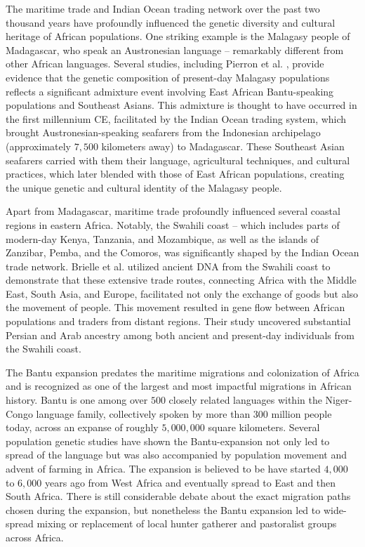The maritime trade and Indian Ocean trading network over the past two thousand years have profoundly influenced the genetic diversity and cultural heritage of African populations. One striking example is the Malagasy people of Madagascar, who speak an Austronesian language -- remarkably different from other African languages. Several studies, including Pierron et al. \cite{pierron2014genome, pierron2017genomic}, provide evidence that the genetic composition of present-day Malagasy populations reflects a significant admixture event involving East African Bantu-speaking populations and Southeast Asians. This admixture is thought to have occurred in the first millennium CE, facilitated by the Indian Ocean trading system, which brought Austronesian-speaking seafarers from the Indonesian archipelago (approximately $7{,}500$ kilometers away) to Madagascar. These Southeast Asian seafarers carried with them their language, agricultural techniques, and cultural practices, which later blended with those of East African populations, creating the unique genetic and cultural identity of the Malagasy people. 

Apart from Madagascar, maritime trade profoundly influenced several coastal regions in eastern Africa. Notably, the Swahili coast -- which includes parts of modern-day Kenya, Tanzania, and Mozambique, as well as the islands of Zanzibar, Pemba, and the Comoros, was significantly shaped by the Indian Ocean trade network. Brielle et al. \cite{brielle2023entwined} utilized ancient DNA from the Swahili coast to demonstrate that these extensive trade routes, connecting Africa with the Middle East, South Asia, and Europe, facilitated not only the exchange of goods but also the movement of people. This movement resulted in gene flow between African populations and traders from distant regions. Their study uncovered substantial Persian and Arab ancestry among both ancient and present-day individuals from the Swahili coast.

The Bantu expansion predates the maritime migrations and colonization of Africa and is recognized as one of the largest and most impactful migrations in African history. Bantu is one among over $500$ closely related languages within the Niger-Congo language family, collectively spoken by more than $300$ million people today, across an expanse of roughly $5{,}000{,}000$ square kilometers. Several population genetic studies \cite{tishkoff2009genetic,de2012bringing,li2014genetic,patin2017dispersals,fortes2024genetic} have shown the Bantu-expansion not only led to spread of the language but was also accompanied by population movement and advent of farming in Africa. The expansion is believed to be have started $4{,}000$ to $6{,}000$ years ago from West Africa and eventually spread to East and then South Africa. There is still considerable debate about the exact migration paths chosen during the expansion, but nonetheless the Bantu expansion led to wide-spread mixing or replacement of local hunter gatherer and pastoralist groups across Africa. 


